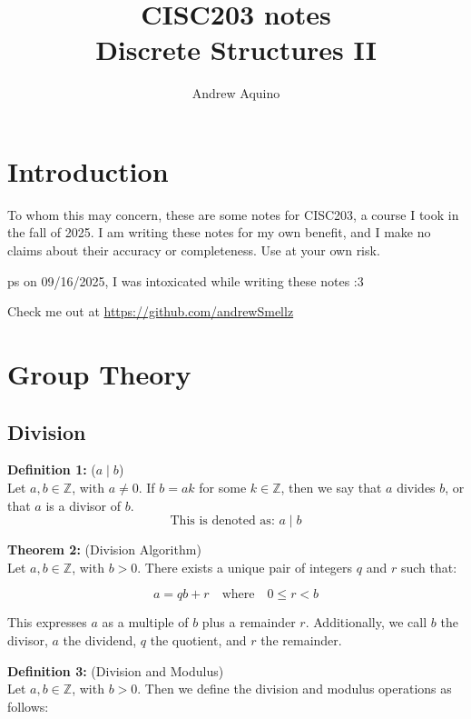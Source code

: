 \documentclass[12pt]{article}
\title{CISC203 notes\\Discrete Structures II}
\author{Andrew Aquino}
\date{}
\begin{document}
\maketitle

\section*{Introduction}

To whom this may concern, these are some notes for CISC203, 
a course I took in the fall of 2025. 
I am writing these notes for my own benefit, 
and I make no claims about their accuracy or completeness. 
Use at your own risk.

ps on 09/16/2025, I was intoxicated while writing these notes :3

Check me out at \url{https://github.com/andrewSmellz}

\tableofcontents
\newpage

\section{Group Theory}

\subsection{Division}

\noindent\textbf{Definition 1:} ($a \mid b$) 
\label{def:divides}
\\Let $a, b \in \mathbb{Z}$, with $a \neq 0$.  
If $b = ak$ for some $k \in \mathbb{Z}$, then we say that $a$ divides $b$,  
or that $a$ is a divisor of $b$. 
\[\text{This is denoted as: } a \mid b\]

\vspace{5mm}

\noindent\textbf{Theorem 2:} (Division Algorithm) 
\label{thm:division}
\\Let $a, b \in \mathbb{Z}$, with $b > 0$.  
There exists a unique pair of integers $q$ and $r$ such that:

\[
a = qb + r \quad \text{where} \quad 0 \leq r < b
\]

\noindent This expresses $a$ as a multiple of $b$ plus a remainder $r$.
Additionally, we call $b$ the divisor, $a$ the dividend, $q$ the quotient, and $r$ the remainder.

\vspace{5mm}

\noindent\textbf{Definition 3:} (Division and Modulus)
\label{def:divmod}
\\Let $a, b \in \mathbb{Z}$, with $b > 0$. 
Then we define the division and modulus operations as follows:
\end{document}
